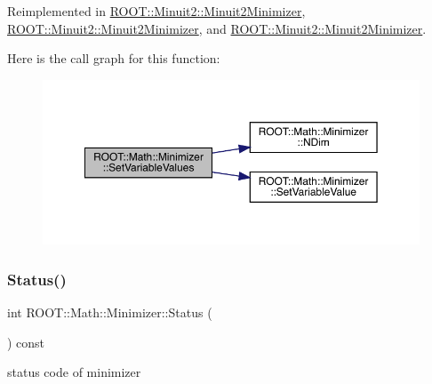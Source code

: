 Reimplemented in \mbox{\hyperlink{classROOT_1_1Minuit2_1_1Minuit2Minimizer_a9511e9711f3d1505556af30046c87d03}{R\+O\+O\+T\+::\+Minuit2\+::\+Minuit2\+Minimizer}}, \mbox{\hyperlink{classROOT_1_1Minuit2_1_1Minuit2Minimizer_a9511e9711f3d1505556af30046c87d03}{R\+O\+O\+T\+::\+Minuit2\+::\+Minuit2\+Minimizer}}, and \mbox{\hyperlink{classROOT_1_1Minuit2_1_1Minuit2Minimizer_a9511e9711f3d1505556af30046c87d03}{R\+O\+O\+T\+::\+Minuit2\+::\+Minuit2\+Minimizer}}.

Here is the call graph for this function\+:
\nopagebreak
\begin{figure}[H]
\begin{center}
\leavevmode
\includegraphics[width=350pt]{dc/dc4/classROOT_1_1Math_1_1Minimizer_ac8368efbd59da8e0b8bc0a0966309609_cgraph}
\end{center}
\end{figure}
\mbox{\label{classROOT_1_1Math_1_1Minimizer_a634833b3a6e525ef10605de5fd051499}} 
\subsubsection{\texorpdfstring{Status()}{Status()}\hspace{0.1cm}{\footnotesize\ttfamily [1/3]}}
{\footnotesize\ttfamily int R\+O\+O\+T\+::\+Math\+::\+Minimizer\+::\+Status (\begin{DoxyParamCaption}{ }\end{DoxyParamCaption}) const\hspace{0.3cm}{\ttfamily [inline]}}



status code of minimizer 

\mbox{\label{classROOT_1_1Math_1_1Minimizer_a634833b3a6e525ef10605de5fd051499}} 
